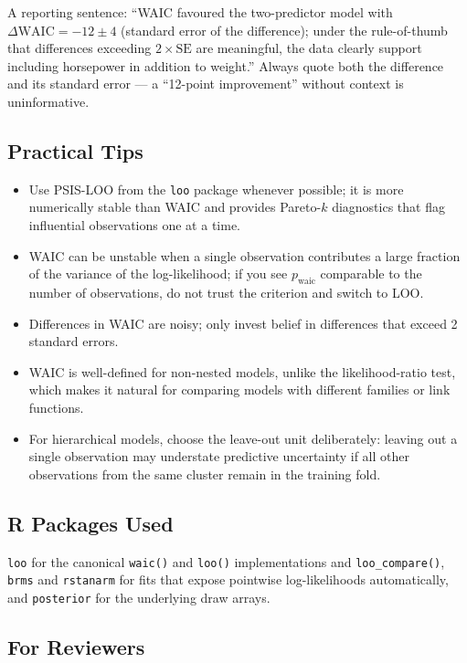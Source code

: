 \documentclass[
]{article}
\providecommand{\tightlist}{%
  \setlength{\itemsep}{0pt}\setlength{\parskip}{0pt}}
\begin{document}
A reporting sentence: ``WAIC favoured the two-predictor model with
\(\Delta\mathrm{WAIC} = -12 \pm 4\) (standard error of the difference);
under the rule-of-thumb that differences exceeding
\(2 \times \mathrm{SE}\) are meaningful, the data clearly support
including horsepower in addition to weight.'' Always quote both the
difference and its standard error --- a ``12-point improvement'' without
context is uninformative.

\subsection{Practical Tips}\label{practical-tips}

\begin{itemize}
\tightlist
\item
  Use PSIS-LOO from the \texttt{loo} package whenever possible; it is
  more numerically stable than WAIC and provides Pareto-\(k\)
  diagnostics that flag influential observations one at a time.
\item
  WAIC can be unstable when a single observation contributes a large
  fraction of the variance of the log-likelihood; if you see
  \(p_{\text{waic}}\) comparable to the number of observations, do not
  trust the criterion and switch to LOO.
\item
  Differences in WAIC are noisy; only invest belief in differences that
  exceed 2 standard errors.
\item
  WAIC is well-defined for non-nested models, unlike the
  likelihood-ratio test, which makes it natural for comparing models
  with different families or link functions.
\item
  For hierarchical models, choose the leave-out unit deliberately:
  leaving out a single observation may understate predictive uncertainty
  if all other observations from the same cluster remain in the training
  fold.
\end{itemize}

\subsection{R Packages Used}\label{r-packages-used}

\texttt{loo} for the canonical \texttt{waic()} and \texttt{loo()}
implementations and \texttt{loo\_compare()}, \texttt{brms} and
\texttt{rstanarm} for fits that expose pointwise log-likelihoods
automatically, and \texttt{posterior} for the underlying draw arrays.

\subsection{For Reviewers}\label{for-reviewers}
\end{document}
